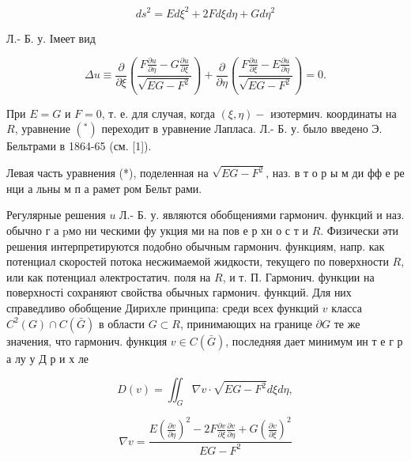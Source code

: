 \documentclass[10pt]{article}
\begin{document}
\[

d s^{2}=E d \xi^{2}+2 F d \xi d \eta+G d \eta^{2}

\]



Л.- Б. у. Імеет вид



\[

\Delta u \equiv \frac{\partial}{\partial \xi}\left(\frac{F \frac{\partial u}{\partial \eta}-G \frac{\partial u}{\partial \xi}}{\sqrt{E G-F^{2}}}\right)+\frac{\partial}{\partial \eta}\left(\frac{F \frac{\partial u}{\partial \xi}-E \frac{\partial u}{\partial \eta}}{\sqrt{E G-F^{2}}}\right)=0 .

\]



При $E=G$ и $F=0$, т. е. для случая, когда $(\xi, \eta)-$ изотермич. координаты на $R$, уравнение $\left(^{*}\right)$ переходит в уравнение Лапласа. Л.- Б. у. было введено Э. Бельтрами в 1864-65 (см. [1]).



Левая часть уравнения (*), поделенная на $\sqrt{E G-F^{2}}$, наз. в т о р ы м ди фф е ре нци а льны м п а рамет ром Бельт рами.



Регулярные решения $u$ Л.- Б. у. являются обобщениями гармонич. функций и наз. обычно г а pмо ни ческими фу укция ми на пов е р хн о с т и $R$. Физически әти решения интерпретируются подобно обычным гармонич. функциям, напр. как потенциал скоростей потока несжимаемой жидкости, текущего по поверхности $R$, или как потенциал әлектростатич. поля на $R$, и т. П. Гармонич. функции на поверхності сохраняют свойства обычных гармонич. функций. Для них справедливо обобщение Дирихле принципа: среди всех функций $v$ класса $C^{2}(G) \cap C(\bar{G})$ в области $G \subset R$, принимающих на границе $\partial G$ те же значения, что гармонич. функция $v \in C(\bar{G})$, последняя дает минимум ин т е г р а лу у Д р и х ле



\[

D(v)=\iint_{G} \nabla v \cdot \sqrt{E G-F^{2}} d \xi d \eta,

\]



\[

\nabla v=\frac{E\left(\frac{\partial v}{\partial \eta}\right)^{2}-2 F \frac{\partial v}{\partial \xi} \frac{\partial v}{\partial \eta}+G\left(\frac{\partial v}{\partial \xi}\right)^{2}}{E G-F^{2}}

\]
\end{document}
